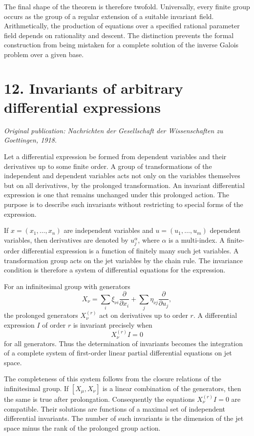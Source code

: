 \documentclass[12pt]{article}
\begin{document}
The final shape of the theorem is therefore twofold. Universally, every finite group occurs as the
group of a regular extension of a suitable invariant field. Arithmetically, the production of
equations over a specified rational parameter field depends on rationality and descent. The
distinction prevents the formal construction from being mistaken for a complete solution of the
inverse Galois problem over a given base.


\section{12. Invariants of arbitrary differential expressions}

\textit{Original publication: Nachrichten der Gesellschaft der Wissenschaften zu Goettingen, 1918.}

Let a differential expression be formed from dependent variables and their derivatives up to some
finite order. A group of transformations of the independent and dependent variables acts not only on
the variables themselves but on all derivatives, by the prolonged transformation. An invariant
differential expression is one that remains unchanged under this prolonged action. The purpose is to
describe such invariants without restricting to special forms of the expression.


If \(x=(x_1, \ldots,x_n)\) are independent variables and \(u=(u_1, \ldots,u_m)\) dependent
variables, then derivatives are denoted by \(u^\alpha_j\), where \(\alpha\) is a multi-index. A
finite-order differential expression is a function of finitely many such jet variables. A
transformation group acts on the jet variables by the chain rule. The invariance condition is
therefore a system of differential equations for the expression.


For an infinitesimal group with generators \[   X_\nu=\sum_i \xi_{\nu i}\frac{\partial}{\partial
x_i}         +\sum_j \eta_{\nu j}\frac{\partial}{\partial u_j}, \] the prolonged generators
\(X_\nu^{(r)}\) act on derivatives up to order \(r\). A differential expression \(I\) of order \(r\)
is invariant precisely when \[   X_\nu^{(r)} I=0 \] for all generators. Thus the determination of
invariants becomes the integration of a complete system of first-order linear partial differential
equations on jet space.


The completeness of this system follows from the closure relations of the infinitesimal group. If
\([X_\mu,X_\nu]\) is a linear combination of the generators, then the same is true after
prolongation. Consequently the equations \(X_\nu^{(r)}I=0\) are compatible. Their solutions are
functions of a maximal set of independent differential invariants. The number of such invariants is
the dimension of the jet space minus the rank of the prolonged group action.
\end{document}
